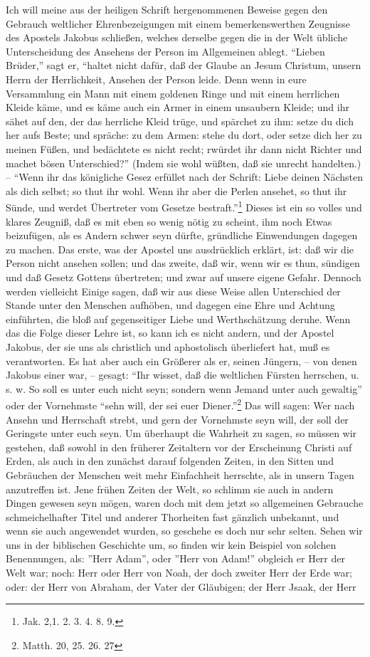 Ich will meine aus der heiligen Schrift hergenommenen Beweise gegen den Gebrauch weltlicher Ehrenbezeigungen mit einem bemerkenswerthen Zeugnisse des Apostels Jakobus schließen, welches derselbe gegen die in der Welt übliche Unterscheidung des Ansehens der Person im Allgemeinen ablegt. "`Lieben Brüder,"' sagt er, "`haltet nicht dafür, daß der Glaube an Jesum Christum, unsern Herrn der Herrlichkeit, Ansehen der Person leide. Denn wenn in eure Versammlung ein Mann mit einem goldenen Ringe und mit einem herrlichen Kleide käme, und es käme auch ein Armer in einem unsaubern Kleide; und ihr sähet auf den, der das herrliche Kleid trüge, und spärchet zu ihm: setze du dich her aufs Beste; und spräche: zu dem Armen: stehe du dort, oder setze dich her zu meinen Füßen, und bedächtete es nicht recht; rwürdet ihr dann nicht Richter und machet bösen Unterschied?"' (Indem sie wohl wüßten, daß sie unrecht handelten.) -- "`Wenn ihr das königliche Gesez erfüllet nach der Schrift: Liebe deinen Nächsten als dich selbst; so thut ihr wohl. Wenn ihr aber die Perlen ansehet, so thut ihr Sünde, und werdet Übertreter vom Gesetze bestraft."'\footnote{Jak. 2,1. 2. 3. 4. 8. 9.} Dieses ist ein so volles und klares Zeugniß, daß es mit eben so wenig nötig zu scheint, ihm noch Etwas beizufügen, als es Andern schwer seyn dürfte, gründliche Einwendungen dagegen zu machen. Das erste, was der Apostel uns ausdrücklich erklärt, ist: daß wir die Person nicht ansehen sollen; und das zweite, daß wir, wenn wir es thun, sündigen und daß Gesetz Gottens übertreten; und zwar auf unsere eigene Gefahr. Dennoch werden vielleicht Einige sagen, daß wir aus diese Weise allen Unterschied der Stande unter den Menschen aufhöben, und dagegen eine Ehre und Achtung einführten, die bloß auf gegenseitiger Liebe und Werthschätzung deruhe. Wenn das die Folge dieser Lehre ist, so kann ich es nicht andern, und der Apostel Jakobus, der sie uns als christlich und aphostolisch überliefert hat, muß es verantworten. Es hat aber auch ein Größerer als er, seinen Jüngern, -- von denen Jakobus einer war, -- gesagt: "`Ihr wisset, daß die weltlichen Fürsten herrschen, u. s. w. So soll es unter euch nicht seyn; sondern wenn Jemand unter auch gewaltig"' oder der Vornehmste "`sehn will, der sei euer Diener."'\footnote{Matth. 20, 25. 26. 27} Das will sagen: Wer nach Ansehn und Herrschaft strebt, und gern der Vornehmste seyn will, der soll der Geringste unter euch seyn. Um überhaupt die Wahrheit zu sagen, so müssen wir gestehen, daß sowohl in den früherer Zeitaltern vor der Erscheinung Christi auf Erden, als auch in den zunächst darauf folgenden Zeiten, in den Sitten und Gebräuchen der Menschen weit mehr Einfachheit herrschte, als in unsern Tagen anzutreffen ist. Jene frühen Zeiten der Welt, so schlimm sie auch in andern Dingen gewesen seyn mögen, waren doch mit dem jetzt so allgemeinen Gebrauche schmeichelhafter Titel und anderer Thorheiten fast gänzlich unbekannt, und wenn sie auch angewendet wurden, so geschehe es doch nur sehr selten. Sehen wir uns in der biblischen Geschichte um, so finden wir kein Beispiel von solchen Benennungen, als: ''Herr Adam'', oder ''Herr von Adam!'' obgleich er Herr der Welt war; noch: Herr oder Herr von Noah, der doch zweiter Herr der Erde war; oder: der Herr von Abraham, der Vater der Gläubigen; der Herr Jsaak, der Herr 